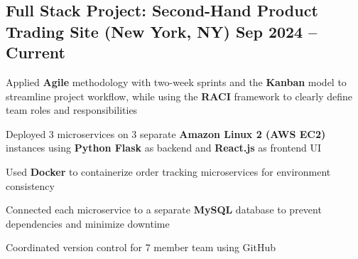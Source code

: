 \documentclass[a4paper,14pt]{article}
\begin{document}
\subsection{\texorpdfstring{Full Stack Project: Second-Hand Product Trading Site \hfill \textnormal{(New York, NY)} Sep 2024 -- Current}{Full Stack Project: Second-Hand Product Trading Site (New York, NY) Sep 2024 -- Current}}
\begin{zitemize}
    \item Applied \textbf{Agile} methodology with two-week sprints and the \textbf{Kanban} model to streamline project workflow, while using the \textbf{RACI} framework to clearly define team roles and responsibilities 
     \item Deployed 3 microservices on 3 separate \textbf{Amazon Linux 2 (AWS EC2)}   instances using \textbf{Python Flask} as backend and \textbf{React.js} as frontend UI 
    \item Used \textbf{Docker} to containerize order tracking microservices for environment consistency
    \item Connected each microservice to a separate \textbf{MySQL} database to prevent dependencies and minimize downtime
    \item Coordinated version control for 7 member team using GitHub
\end{zitemize}
%
\end{document}
